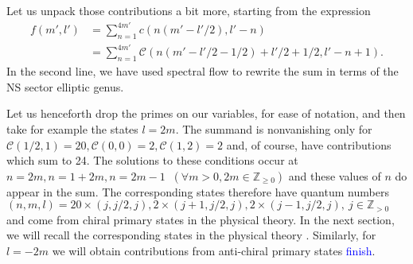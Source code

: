 \documentclass[11pt]{amsart}
\newcommand{\Z}{\mathbb Z}
\theoremstyle{thm}
\numberwithin{equation}{subsection}
\theoremstyle{def}
\theoremstyle{rem}
\begin{document}

Let us unpack those contributions a bit more, starting from the expression 
\begin{align*}\label{eq:fml1}
f(m', l') &= \sum_{n=1}^{4m'}c(n(m'-l'/2), l'-n) \\
&= \sum_{n=1}^{4m'}\mathcal{C}(n(m'-l'/2 - 1/2) + l'/2 + 1/2, l' - n +1).
\end{align*} In the second line, we have used spectral flow to rewrite the sum in terms of the NS sector elliptic genus.


Let us henceforth drop the primes on our variables, for ease of notation, and then take for example the states $l = 2 m$. The summand is nonvanishing only for $\mathcal{C}(1/2, 1)= 20, \mathcal{C}(0, 0)=2, \mathcal{C}(1, 2)= 2$ and, of course, have contributions which sum to 24. The solutions to these conditions occur at $n=2m, n = 1 + 2m, n=2m -1$ $ \ (\forall m >0, 2m \in \Z_{\geq 0})$ and these values of $n$ do appear in the sum. The corresponding states therefore have quantum numbers $(n, m, l) = 20\times(j, j/2, j), 2\times(j + 1, j/2, j), 2\times(j-1, j/2, j), \ j \in \Z_{>0}$ and come from chiral primary states in the physical theory. In the next section, we will recall the corresponding states in the physical theory \cite{luninmathur, others...}. Similarly, for $l = -2m$ we will obtain contributions from anti-chiral primary states \textcolor{blue}{finish}. 
\end{document}

